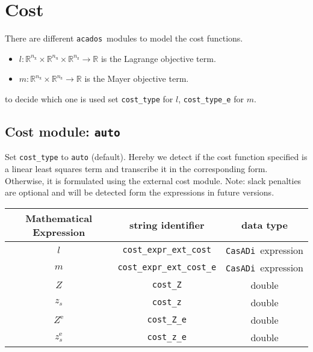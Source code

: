 \documentclass{article}
\newcommand{\code}[1]{\texttt{#1}}
\newcommand{\casadi}{\texttt{CasADi}}
\newcommand{\acados}{\texttt{acados}}
\newcommand{\ind}[1]{_{\textrm{#1}}}
\newcommand{\terminal}{^{\textrm{e}}}
\newcommand{\nx}{n\ind{x}}
\newcommand{\nuu}{n\ind{u}}
\newcommand{\nz}{n\ind{z}}
\begin{document}
\section{Cost}
There are different \acados~modules to model the cost functions.
\begin{itemize}
\item $ l: \mathbb{R}^{\nx}\times\mathbb{R}^{\nuu}\times\mathbb{R}^{\nz} \rightarrow \mathbb{R}$ is the Lagrange objective term.
\item $ m: \mathbb{R}^{\nx}\times\mathbb{R}^{\nz} \rightarrow \mathbb{R} $ is the Mayer objective term.
\end{itemize}
to decide which one is used set \code{cost\_type} for $ l $, \code{cost\_type\_e} for $ m $.

\subsection*{Cost module: \code{auto}}
Set \code{cost\_type} to \code{auto} (default).
Hereby we detect if the cost function specified is a linear least squares term and transcribe it in the corresponding form.
Otherwise, it is formulated using the external cost module.
Note: slack penalties are optional and will be detected form the expressions in future versions.
\begin{table}[h!]
	\centering
	\begin{tabular}{|c|c|c|}
		\toprule
		Mathematical Expression                    & string identifier & data type \\ \midrule
		$ l $ & \code{cost\_expr\_ext\_cost}    & \casadi~expression    \\ \midrule
		$ m $ & \code{cost\_expr\_ext\_cost\_e}    & \casadi~expression    \\ \midrule
		$ Z $ & \code{cost\_Z}    & double    \\ \midrule
		$ z_s $ & \code{cost\_z}    & double    \\ \midrule
		$ Z\terminal $ & \code{cost\_Z\_e}    & double    \\ \midrule
		$ z_s\terminal $ & \code{cost\_z\_e}    & double    \\
		\bottomrule
	\end{tabular}
\end{table}

\end{document}
